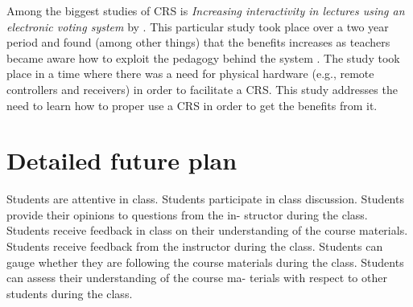 \documentclass{article}
\begin{document}
Among the biggest studies of CRS is \emph{Increasing interactivity in lectures using an electronic voting system} by . This particular study took place over a two year period and found (among other things) that the benefits increases as teachers became aware how to exploit the pedagogy behind the system \cite[p.~93]{draper2004increasing}. The study took place in a time where there was a need for physical hardware (e.g., remote controllers and receivers) in order to facilitate a CRS. This study addresses the need to learn how to proper use a CRS in order to get the benefits from it.














\section{Detailed future plan} %








    
    
    Students are attentive in class.
    Students participate in class discussion.
    Students provide their opinions to questions from the in- structor during the class.
    Students receive feedback in class on their understanding of the course materials.
    Students receive feedback from the instructor during the class.
    Students can gauge whether they are following the course materials during the class.
    Students can assess their understanding of the course ma- terials with respect to other students during the class.
\end{document}
